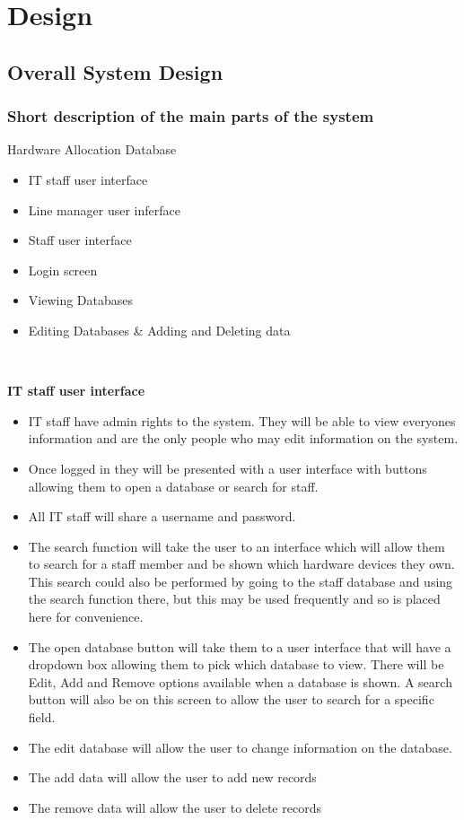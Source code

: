 \chapter{Design}

\section{Overall System Design}

\subsection{Short description of the main parts of the system}

Hardware Allocation Database

\begin{itemize}
\item IT staff user interface
\item Line manager user inferface
\item Staff user interface
\item Login screen
\item Viewing Databases
\item Editing Databases \& Adding and Deleting data
\end{itemize}

\

\textbf{IT staff user interface}

\begin{itemize}
\item IT staff have admin rights to the system. They will be able to view everyones information and are the only people who may edit information on the system.
\item Once logged in they will be presented with a user interface with buttons allowing them to open a database or search for staff.
\item All IT staff will share a username and password.
\item The search function will take the user to an interface which will allow them to search for a staff member and be shown which hardware devices they own. This search could also be performed by going to the staff database and using the search function there, but this may be used frequently and so is placed here for convenience.
\item The open database button will take them to a user interface that will have a dropdown box allowing them to pick which database to view. There will be Edit, Add and Remove options available when a database is shown. A search button will also be on this screen to allow the user to search for a specific field.
\item The edit database will allow the user to change information on the database.
\item The add data will allow the user to add new records
\item The remove data will allow the user to delete records
\end{itemize}

